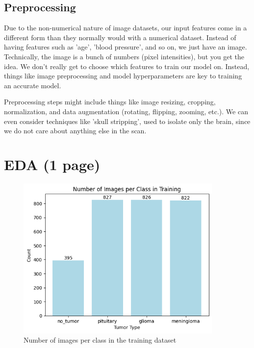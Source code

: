 \documentclass[conference]{IEEEtran}
\begin{document}
\subsection{\large Preprocessing}

Due to the non-numerical nature of image datasets, our input features come in a different form than they normally would with a numerical dataset. Instead of having features such as 'age', 'blood pressure', and so on, we just have an image. Technically, the image is a bunch of numbers (pixel intensities), but you get the idea. We don't really get to choose which features to train our model on. Instead, things like image preprocessing and model hyperparameters are key to training an accurate model.

Preprocessing steps might include things like image resizing, cropping, normalization, and data augmentation (rotating, flipping, zooming, etc.). We can even consider techniques like 'skull stripping', used to isolate only the brain, since we do not care about anything else in the scan.


\section{\large EDA (1 page)}



\begin{figure}[!ht]
    \centering
    \includegraphics[width=4in]{ImagesPerClassTraining.png}
    \caption{\large Number of images per class in the training dataset}
    \label{Number of images per class in the training dataset}
\end{figure}
\end{document}
